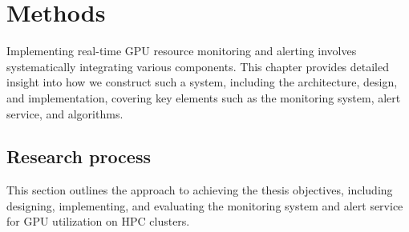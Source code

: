 \chapter{Methods}
\label{chap:methods}
Implementing real-time GPU resource monitoring and alerting involves systematically integrating various components. This chapter provides detailed insight into how we construct such a system, including the architecture, design, and implementation, covering key elements such as the monitoring system, alert service, and algorithms.

\section{Research process}
This section outlines the approach to achieving the thesis objectives, including designing, implementing, and evaluating the monitoring system and alert service for GPU utilization on HPC clusters.


